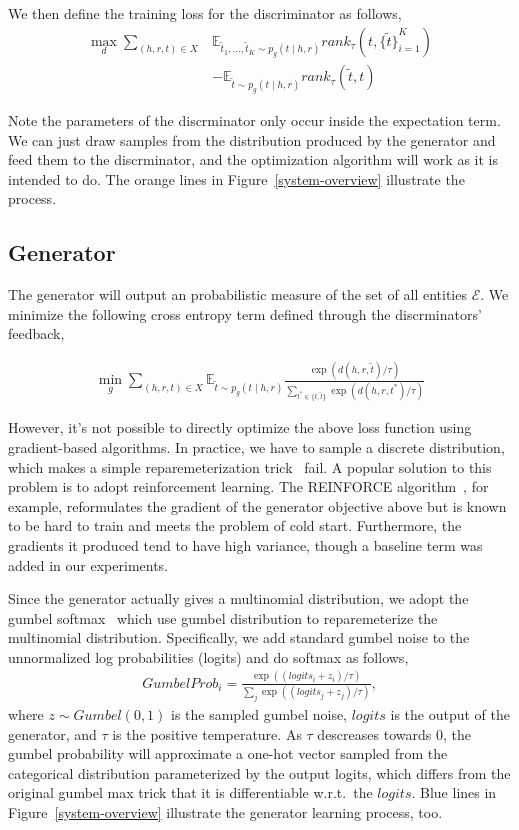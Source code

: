 \documentclass[twocolumn,a4paper,10pt,review,5p]{elsarticle}
\begin{document}
We then define the training loss for the discriminator as follows,
\begin{align*}
    \max_d \sum_{(h, r, t)\in X}
        &\mathbb{E}_{\tilde t_1, \dots, \tilde t_K \sim p_g(t \mid h, r)}
            rank_\tau(t, {\{\tilde t \}}_{i=1}^K) \\
        &- \mathbb{E}_{\tilde t \sim p_g(t \mid h, r)}
            rank_\tau(\tilde t, t)
\end{align*}

Note the parameters of the discrminator only occur inside the expectation term. We can just draw samples from the distribution produced by the generator and feed them to the discrminator, and the optimization algorithm will work as it is intended to do. The orange lines in Figure~\ref{system-overview} illustrate the process.

\subsection{Generator}

The generator will output an probabilistic measure of the set of all entities $\mathcal{E}$. We minimize the following cross entropy term defined through the discrminators' feedback,

\begin{align*}
    \min_g \sum_{(h, r, t)\in X}
        \mathbb{E}_{\tilde t \sim p_g(t \mid h, r)}
            \frac{\exp(d(h, r, \tilde t) / \tau)}
                 {\sum_{t^* \in \{ t, \tilde t\}} \exp(d(h, r, t^*) / \tau)}
\end{align*}

However, it's not possible to directly optimize the above loss function using gradient-based algorithms. In practice, we have to sample a discrete distribution, which makes a simple reparemeterization trick~\cite{VAE} fail. A popular solution to this problem is to adopt reinforcement learning. The REINFORCE algorithm~\cite{Williams_1992}, for example, reformulates the gradient of the generator objective above but is known to be hard to train and meets the problem of cold start. Furthermore, the gradients it produced tend to have high variance, though a baseline term was added in our experiments.

Since the generator actually gives a multinomial distribution, we adopt the gumbel softmax~\cite{GumbelSoftmax_Jiang_2016} which use gumbel distribution to reparemeterize the multinomial distribution. Specifically, we add standard gumbel noise to the unnormalized log probabilities (logits) and do softmax as follows,
\begin{align*}
    GumbelProb_i = \frac{\exp((logits_i + z_i)/ \tau)}{\sum_{j}\exp((logits_j + z_j)/ \tau)},
\end{align*}
where $z \sim Gumbel(0, 1)$ is the sampled gumbel noise, $logits$ is the output of the generator, and $\tau$ is the positive temperature. As $\tau$ descreases towards 0, the gumbel probability will approximate a one-hot vector sampled from the categorical distribution parameterized by the output logits, which differs from the original gumbel max trick that it is differentiable w.r.t.\ the $logits$. Blue lines in Figure~\ref{system-overview} illustrate the generator learning process, too.
\end{document}
